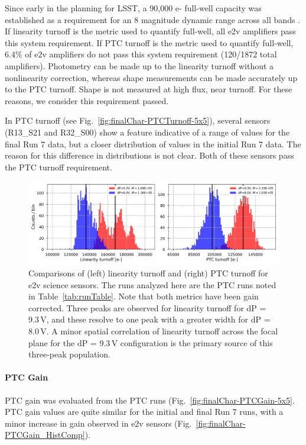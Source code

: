 Since early in the planning for LSST, a 90,000 e- full-well capacity was established as a requirement for an 8 magnitude dynamic range across all bands \citep{AndyFullWell}. If linearity turnoff is the metric used to quantify full-well, all e2v amplifiers pass this system requirement. If PTC turnoff is the metric used to quantify full-well, 6.4\% of e2v amplifiers do not pass this system requirement (120/1872 total amplifiers). Photometry can be made up to the linearity turnoff without a nonlinearity correction, whereas shape measurements can be made accurately up to the PTC turnoff. Shape is not measured at high flux, near turnoff. For these reasons, we consider this requirement passed.

In PTC turnoff (see Fig.~\ref{fig:finalChar-PTCTurnoff-5x5}), several sensors (R13\_S21 and R32\_S00) show a feature indicative of a range of values for the final Run 7 data, but a closer distribution of values in the initial Run 7 data. The reason for this difference in distributions is not clear. Both of these sensors pass the PTC turnoff requirement.

\begin{figure}[ht]
    \centering
    \includegraphics[width=0.7\linewidth]{figures/finalCharacterization/fullWellComparisons.jpg}
    \caption{Comparisons of (left) linearity turnoff and (right) PTC turnoff for e2v science sensors. The runs analyzed here are the PTC runs noted in Table~\ref{tab:runTable}. Note that both metrics have been gain corrected. Three peaks are observed for linearity turnoff for dP = 9.3\,V, and these resolve to one peak with a greater width for dP = 8.0\,V. A minor spatial correlation of linearity turnoff across the focal plane for the dP = 9.3\,V configuration is the primary source of this three-peak population.}
    \label{fig:finalChar-fullWell}
\end{figure}


\clearpage
\paragraph{PTC Gain}\label{final-ptc-gain}

PTC gain was evaluated from the PTC runs (Fig.~\ref{fig:finalChar-PTCGain-5x5}. PTC gain values are quite similar for the initial and final Run 7 runs, with a minor increase in gain observed in e2v sensors (Fig.~\ref{fig:finalChar-PTCGain_HistComp}).

